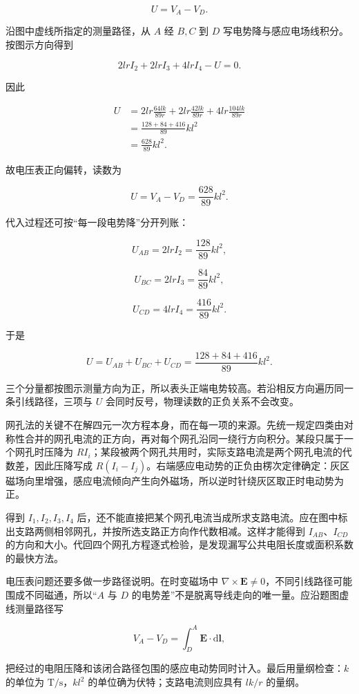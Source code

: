 \documentclass[12pt,a4paper,UTF8]{ctexart}
\begin{document}
\[U=V_A-V_D.\]

沿图中虚线所指定的测量路径，从 \(A\) 经 \(B,C\) 到 \(D\)
写电势降与感应电场线积分。按图示方向得到

\[2lrI_2+2lrI_3+4lrI_4-U=0. \tag{10}\]

因此

\[\begin{aligned}
U
&=2lr\frac{64lk}{89r}
+2lr\frac{42lk}{89r}
+4lr\frac{104lk}{89r}\\
&=\frac{128+84+416}{89}kl^2\\
&=\frac{628}{89}kl^2.
\end{aligned}\]

故电压表正向偏转，读数为

\[\boxed{U=V_A-V_D=\frac{628}{89}kl^2}. \tag{11}\]

代入过程还可按``每一段电势降''分开列账：

\[U_{AB}=2lrI_2=\frac{128}{89}kl^2,\]

\[U_{BC}=2lrI_3=\frac{84}{89}kl^2,\]

\[U_{CD}=4lrI_4=\frac{416}{89}kl^2.\]

于是

\[U=U_{AB}+U_{BC}+U_{CD}
=\frac{128+84+416}{89}kl^2.\]

三个分量都按图示测量方向为正，所以表头正端电势较高。若沿相反方向遍历同一条引线路径，三项与
\(U\) 会同时反号，物理读数的正负关系不会改变。

网孔法的关键不在解四元一次方程本身，而在每一项的来源。先统一规定四类由对称性合并的网孔电流的正方向，再对每个网孔沿同一绕行方向积分。某段只属于一个网孔时压降为
\(RI_i\)；某段被两个网孔共用时，实际支路电流是两个网孔电流的代数差，因此压降写成
\(R(I_i-I_j)\)。右端感应电动势的正负由楞次定律确定：灰区磁场向里增强，感应电流倾向产生向外磁场，所以逆时针绕灰区取正时电动势为正。

得到 \(I_1,I_2,I_3,I_4\)
后，还不能直接把某个网孔电流当成所求支路电流。应在图中标出支路两侧相邻网孔，并按所选支路正方向作代数相减。这样才能得到
\(I_{AB}\)、\(I_{CD}\)
的方向和大小。代回四个网孔方程逐式检验，是发现漏写公共电阻长度或面积系数的最快方法。

电压表问题还要多做一步路径说明。在时变磁场中
\(\nabla\times\boldsymbol E\ne0\)，不同引线路径可能围成不同磁通，所以``\(A\)
与 \(D\) 的电势差''不是脱离导线走向的唯一量。应沿题图虚线测量路径写

\[V_A-V_D=\int_D^A\boldsymbol E\cdot\mathrm d\boldsymbol l,\]

把经过的电阻压降和该闭合路径包围的感应电动势同时计入。最后用量纲检查：\(k\)
的单位为 \(\mathrm{T/s}\)，\(kl^2\) 的单位确为伏特；支路电流则应具有
\(lk/r\) 的量纲。
\end{document}
